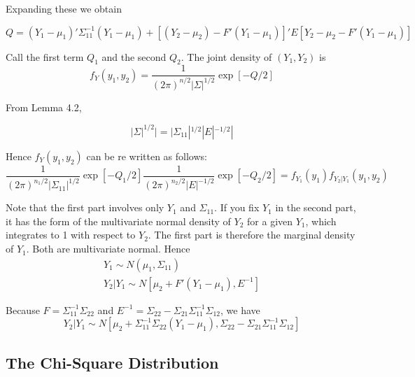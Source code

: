 \documentclass{article}
\begin{document}
Expanding these we obtain

\begin{equation*}
    Q= (Y_1-\mu_1)' \Sigma_{11}^{-1} (Y_1-\mu_1)+[(Y_2-\mu_2)-F'(Y_1-\mu_1)]'E[Y_2-\mu_2-F'(Y_1-\mu_1)]
\end{equation*}

Call the first term \(Q_1\) and the second \(Q_2\). The joint density of \((Y_1,Y_2)\) is
\begin{equation*}
    f_Y(y_1,y_2)=\frac{1}{(2\pi)^{n/2}|\Sigma|^{1/2}} \exp{[-Q/2]}
\end{equation*}

From Lemma 4.2,

\begin{equation*}
    |\Sigma|^{1/2}|=|\Sigma_{11}|^{1/2} |E|^{-1/2}|
\end{equation*}

Hence \(f_Y(y_1,y_2)\) can be re written as follows:
\begin{equation*}
    \frac{1}{(2\pi)^{n_1/2}|\Sigma_{11}|^{1/2}} \exp{[-Q_1/2]} \frac{1}{(2\pi)^{n_2/2}|E|^{-1/2}} \exp{[-Q_2/2]} = f_{Y_1}(y_1) f_{Y_2|Y_1}(y_1,y_2)
\end{equation*}

Note that the first part involves only \(Y_1\) and \(\Sigma_{11}\). If you fix \(Y_1\) in the second part, it has the form of the multivariate normal density of \(Y_2\) for a given \(Y_1\), which integrates to 1 with respect to \(Y_2\). The first part is therefore the marginal density of \(Y_1\). Both are multivariate normal. Hence
\begin{equation*}
\begin{split}
        Y_1 \sim N(\mu_1,\Sigma_{11})\\
        Y_2|Y_1 \sim N[\mu_2+F'(Y_1-\mu_1),E^{-1}]
\end{split}
\end{equation*}

Because \(F=\Sigma_{11}^{-1}\Sigma_{22}\) and \(E^{-1}=\Sigma_{22}-\Sigma_{21}\Sigma_{11}^{-1}\Sigma_{12}\), we have
\begin{equation*}
     Y_2|Y_1 \sim N[\mu_2+\Sigma_{11}^{-1}\Sigma_{22}(Y_1-\mu_1),\Sigma_{22}-\Sigma_{21}\Sigma_{11}^{-1}\Sigma_{12}]
\end{equation*}

\subsection{The Chi-Square Distribution}
\end{document}
